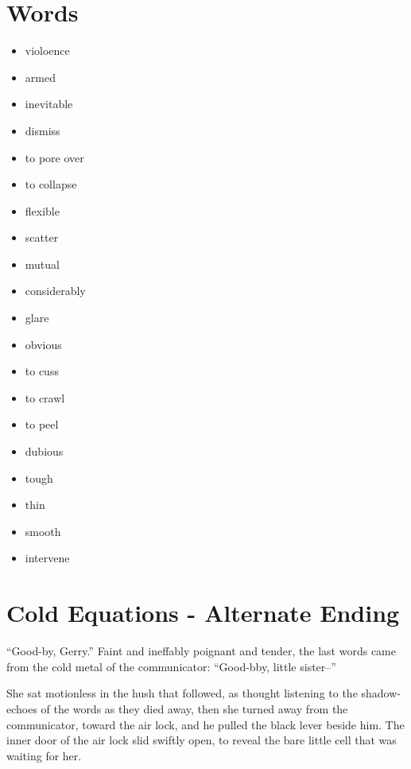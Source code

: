 \section{Words}

\begin{itemize}
    \item violoence
    \item armed
    \item inevitable   %
    \item dismiss
    \item to pore over %
    \item to collapse  
    \item flexible    
    \item scatter      %
    \item mutual       %
    \item considerably
    \item glare
    \item obvious
    \item to cuss      %
    \item to crawl
    \item to peel
    \item dubious      %
    \item tough
    \item thin         %
    \item smooth
    \item intervene    %
\end{itemize}


\section{Cold Equations - Alternate Ending}

``Good-by, Gerry.''
Faint and ineffably poignant and tender, the last words came from the cold metal
of the communicator:
``Good-bby, little sister--''

She sat motionless in the hush  that  followed,  as  thought  listening  to  the
shadow-echoes of the  words  as  they  died  away, then she turned away from the
communicator, toward the air lock, and he pulled the black lever beside him. The
inner  door of the air lock slid swiftly open, to reveal the  bare  little  cell
that was waiting for her.

